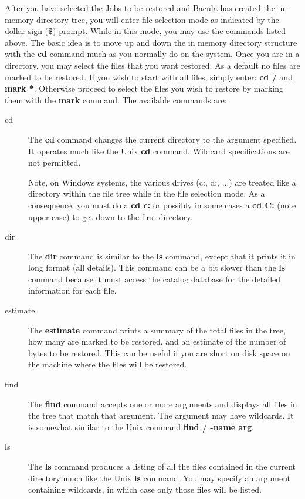 After you have selected the Jobs to be restored and Bacula has created the
in-memory directory tree, you will enter file selection mode as indicated by
the dollar sign ({\bf \$}) prompt. While in this mode, you may use the
commands listed above. The basic idea is to move up and down the in memory
directory structure with the {\bf cd} command much as you normally do on the
system. Once you are in a directory, you may select the files that you want
restored. As a default no files are marked to be restored. If you wish to
start with all files, simply enter: {\bf cd /} and {\bf mark *}. Otherwise
proceed to select the files you wish to restore by marking them with the {\bf
mark} command. The available commands are: 

\begin{description}

\item [cd]
  The {\bf cd} command changes the current directory to the argument specified.
  It operates much like the Unix {\bf cd} command.  Wildcard specifications are
  not permitted.

  Note, on Windows systems, the various drives (c:, d:, ...) are treated like a
  directory within the file tree while in the file selection mode. As a
  consequence, you must do a {\bf cd c:} or possibly in some cases a {\bf cd
    C:} (note upper case) to get down to the first directory.

\item [dir]
   The {\bf dir} command is similar to the {\bf ls} command, except that it
   prints it in long format (all details). This command can be a bit slower
   than the {\bf ls} command because it must access the catalog database for
   the detailed information for each file.

\item [estimate]
   The {\bf estimate} command prints a summary of the total files in the tree,
   how many are marked to be restored, and an estimate of the number of bytes
   to be restored. This can be useful if you are short on disk space on the
   machine where the files will be restored.

\item [find]
   The {\bf find} command accepts one or more arguments  and displays all files
   in the tree that match that argument. The argument  may have wildcards. It is
   somewhat similar to the Unix command  {\bf find / -name arg}.  

\item [ls]
   The {\bf ls} command produces a listing of all the files  contained in the
   current directory much like the Unix {\bf ls} command.  You may specify an
   argument containing wildcards, in which case only  those files will be
   listed.


\end{description}

